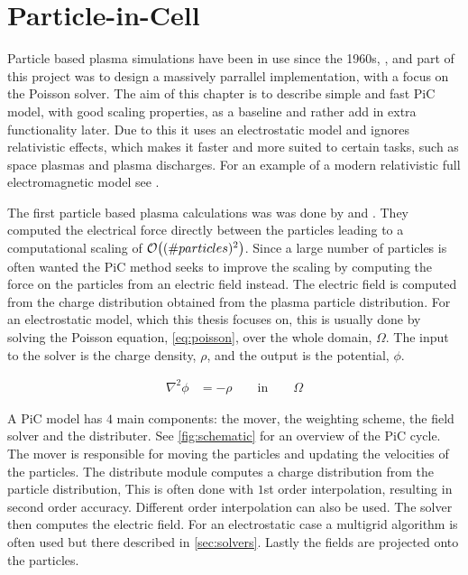 \section{Particle-in-Cell}

    Particle based plasma simulations have been in use since the 1960s, \citep{verboncoeur_particle_2005},
    and part of this project was to design a massively parrallel implementation,
    with a focus on the Poisson solver.
    The aim of this chapter is to describe simple and fast PiC model, with good scaling properties, as a baseline
    and rather add in extra functionality later. Due to this it uses an electrostatic model and
    ignores relativistic effects, which makes it faster and more suited to certain tasks, such as
	space plasmas and plasma discharges.
    For an example of a modern relativistic full electromagnetic model see
    \citet{sgattoni_piccante:_2015}.

    The first particle based plasma calculations was
    was done by \cite{dawson_one-dimensional_1962} and \citet{buneman_dissipation_1959}.
    They computed the electrical force directly between the particles leading
    to a computational scaling of \(\order{(\#particles)^2}\).
    Since a large number of particles is often wanted the PiC method seeks to improve
    the scaling by computing the force on the particles from an electric field instead.
    The electric field is computed from the charge distribution obtained from the plasma particle
	distribution. For an electrostatic model, which this thesis focuses on, this is usually done by solving the Poisson
    equation, \cref{eq:poisson}, over the whole domain, \(\Omega\).
    The input to the solver is the charge density, \(\rho\), and the output is the potential, \(\phi\).

    \begin{align}
        \nabla ^2 \phi &= -\rho \qquad \text{in} \qquad \Omega \label{eq:poisson}
    \end{align}

	A PiC model has \(4\) main components: the mover, the weighting scheme, the field solver
	and the distributer. See \cref{fig:schematic} for an overview of the PiC cycle.
	The mover is responsible for moving the particles and updating the velocities of the particles.
    The distribute module computes a charge distribution from the particle distribution,
	This is often done with \(1\)st order interpolation, resulting in second order accuracy. Different order
	interpolation can also be used.
    The solver then computes the electric field. For an electrostatic case a multigrid algorithm is
	often used but there described in \cref{sec:solvers}.
    Lastly the fields are projected onto the particles.

